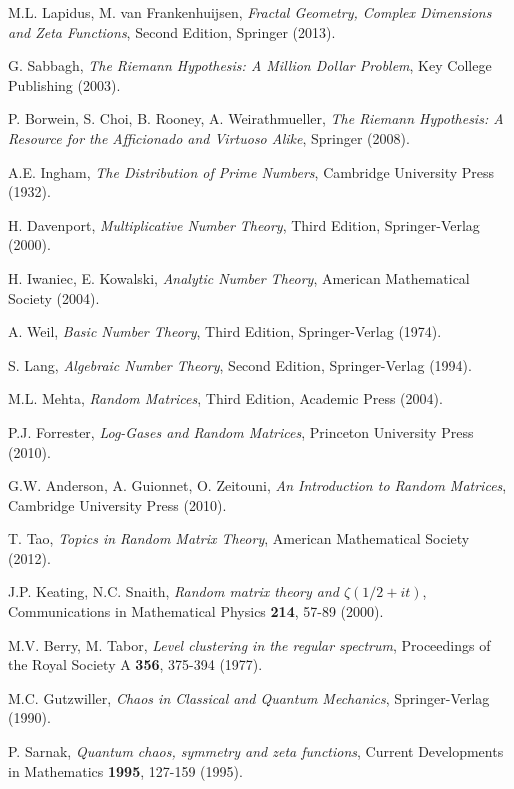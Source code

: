 \documentclass[12pt]{article}
\theoremstyle{plain}
\theoremstyle{definition}
\begin{document}
\begin{thebibliography}{99}
 M.L. Lapidus, M. van Frankenhuijsen, \emph{Fractal Geometry, Complex Dimensions and Zeta Functions}, Second Edition, Springer (2013).

 G. Sabbagh, \emph{The Riemann Hypothesis: A Million Dollar Problem}, Key College Publishing (2003).

 P. Borwein, S. Choi, B. Rooney, A. Weirathmueller, \emph{The Riemann Hypothesis: A Resource for the Afficionado and Virtuoso Alike}, Springer (2008).

 A.E. Ingham, \emph{The Distribution of Prime Numbers}, Cambridge University Press (1932).

 H. Davenport, \emph{Multiplicative Number Theory}, Third Edition, Springer-Verlag (2000).

 H. Iwaniec, E. Kowalski, \emph{Analytic Number Theory}, American Mathematical Society (2004).

 A. Weil, \emph{Basic Number Theory}, Third Edition, Springer-Verlag (1974).

 S. Lang, \emph{Algebraic Number Theory}, Second Edition, Springer-Verlag (1994).

 M.L. Mehta, \emph{Random Matrices}, Third Edition, Academic Press (2004).

 P.J. Forrester, \emph{Log-Gases and Random Matrices}, Princeton University Press (2010).

 G.W. Anderson, A. Guionnet, O. Zeitouni, \emph{An Introduction to Random Matrices}, Cambridge University Press (2010).

 T. Tao, \emph{Topics in Random Matrix Theory}, American Mathematical Society (2012).

 J.P. Keating, N.C. Snaith, \emph{Random matrix theory and $\zeta(1/2+it)$}, Communications in Mathematical Physics \textbf{214}, 57-89 (2000).

 M.V. Berry, M. Tabor, \emph{Level clustering in the regular spectrum}, Proceedings of the Royal Society A \textbf{356}, 375-394 (1977).

 M.C. Gutzwiller, \emph{Chaos in Classical and Quantum Mechanics}, Springer-Verlag (1990).

 P. Sarnak, \emph{Quantum chaos, symmetry and zeta functions}, Current Developments in Mathematics \textbf{1995}, 127-159 (1995).


\end{thebibliography}
\end{document}
